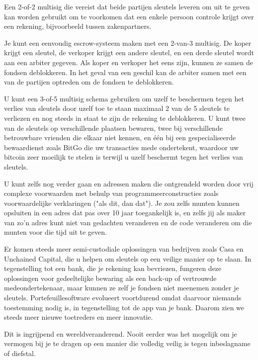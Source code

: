 \documentclass[smalldemyvopaper,11pt,twoside,onecolumn,openright,extrafontsizes]{memoir}
\begin{document}
Een 2-of-2 multisig die vereist dat beide partijen sleutels leveren om uit te geven kan worden gebruikt om te voorkomen dat een enkele persoon controle krijgt over een rekening, bijvoorbeeld tussen zakenpartners. 

Je kunt een eenvoudig escrow-systeem maken met een 2-van-3 multisig. De koper krijgt een sleutel, de verkoper krijgt een andere sleutel, en een derde sleutel wordt aan een arbiter gegeven. Als koper en verkoper het eens zijn, kunnen ze samen de fondsen deblokkeren. In het geval van een geschil kan de arbiter samen met een van de partijen optreden om de fondsen te deblokkeren. 

U kunt een 3-of-5 multisig schema gebruiken om uzelf te beschermen tegen het verlies van sleutels door uzelf toe te staan maximaal 2 van de 5 sleutels te verliezen en nog steeds in staat te zijn de rekening te deblokkeren. U kunt twee van de sleutels op verschillende plaatsen bewaren, twee bij verschillende betrouwbare vrienden die elkaar niet kennen, en één bij een gespecialiseerde bewaardienst zoals BitGo die uw transacties mede ondertekent, waardoor uw bitcoin zeer moeilijk te stelen is terwijl u uzelf beschermt tegen het verlies van sleutels. 

U kunt zelfs nog verder gaan en adressen maken die ontgrendeld worden door vrij complexe voorwaarden met behulp van programmeerconstructies zoals voorwaardelijke verklaringen ("als dit, dan dat"). Je zou zelfs munten kunnen opsluiten in een adres dat pas over 10 jaar toegankelijk is, en zelfs jij als maker van zo'n adres kunt niet van gedachten veranderen en de code veranderen om die munten voor die tijd uit te geven. 

Er komen steeds meer semi-custodiale oplossingen van bedrijven zoals Casa en Unchained Capital, die u helpen om sleutels op een veilige manier op te slaan. In tegenstelling tot een bank, die je rekening kan bevriezen, fungeren deze oplossingen voor gedeeltelijke bewaring als een back-up of vertrouwde medeondertekenaar, maar kunnen ze zelf je fondsen niet meenemen zonder je sleutels. Portefeuillesoftware evolueert voortdurend omdat daarvoor niemands toestemming nodig is, in tegenstelling tot de app van je bank. Daarom zien we steeds meer nieuwe toetreders en meer innovatie. 

Dit is ingrijpend en wereldveranderend. Nooit eerder was het mogelijk om je vermogen bij je te dragen op een manier die volledig veilig is tegen inbeslagname of diefstal. 
\end{document}
